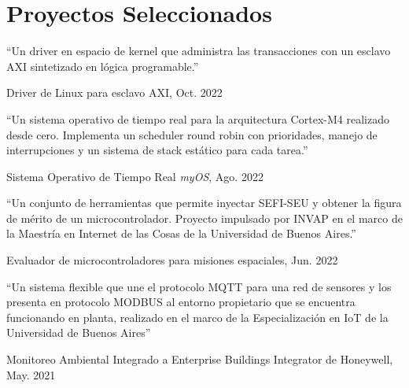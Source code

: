 \section{Proyectos Seleccionados}

\newcommand{\pub}[5]{
	\parbox[t][][t]{\linewidth}{%
		\begin{small}
		\parbox{\linewidth}{{``#4''}}
		\smallbreak
		\parbox{\linewidth}{{#2}, {#1}}
		\parbox{\linewidth}{{\href{https://doi.org/#3}{#3}}}
		\end{small}
	}
	\bigbreak
	\smallskip
}

\pub{Oct. 2022}{Driver de Linux para esclavo AXI}{}{Un driver en espacio de kernel que administra las transacciones con un esclavo AXI sintetizado en lógica programable.}{
}

\pub{Ago. 2022}{Sistema Operativo de Tiempo Real \emph{myOS}}{}{Un sistema operativo de tiempo real para la arquitectura Cortex-M4 realizado desde cero. Implementa un scheduler round robin con prioridades, manejo de interrupciones y un sistema de stack estático para cada tarea.}{
}

\pub{Jun. 2022}{Evaluador de microcontroladores para misiones espaciales}{}{Un conjunto de herramientas que permite inyectar SEFI-SEU y obtener la figura de mérito de un microcontrolador. Proyecto impulsado por INVAP en el marco de la Maestría en Internet de las Cosas de la Universidad de Buenos Aires.}{
}

\pub{May. 2021}{Monitoreo Ambiental Integrado a Enterprise Buildings Integrator de Honeywell}{}{Un sistema flexible que une el protocolo MQTT para una red de sensores y los presenta en protocolo MODBUS al entorno propietario que se encuentra funcionando en planta, realizado en el marco de la Especialización en IoT de la Universidad de Buenos Aires}{
}


